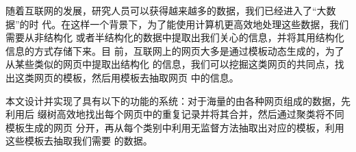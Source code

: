 

\makeatletter
\ifthu@bachelor\relax\else
  \ifthu@doctor
  \else
    \ifthu@master
    \fi
  \fi
\fi
\makeatother





\begin{cabstract}
  随着互联网的发展，研究人员可以获得越来越多的数据，我们已经进入了“大数据”的时
  代。在这样一个背景下，为了能使用计算机更高效地处理这些数据，我们需要从非结构化
  或者半结构化的数据中提取出我们关心的信息，并将其用结构化信息的方式存储下来。目
  前，互联网上的网页大多是通过模板动态生成的，为了从某些类似的网页中提取出结构化
  的信息，我们可以挖掘这类网页的共同点，找出这类网页的模板，然后用模板去抽取网页
  中的信息。

  本文设计并实现了具有以下的功能的系统：对于海量的由各种网页组成的数据，先利用后
  缀树高效地找出每个网页中的重复记录并将其合并，然后通过聚类将不同模板生成的网页
  分开，再从每个类别中利用无监督方法抽取出对应的模板，利用这些模板去抽取我们需要
  的数据。
\end{cabstract}

